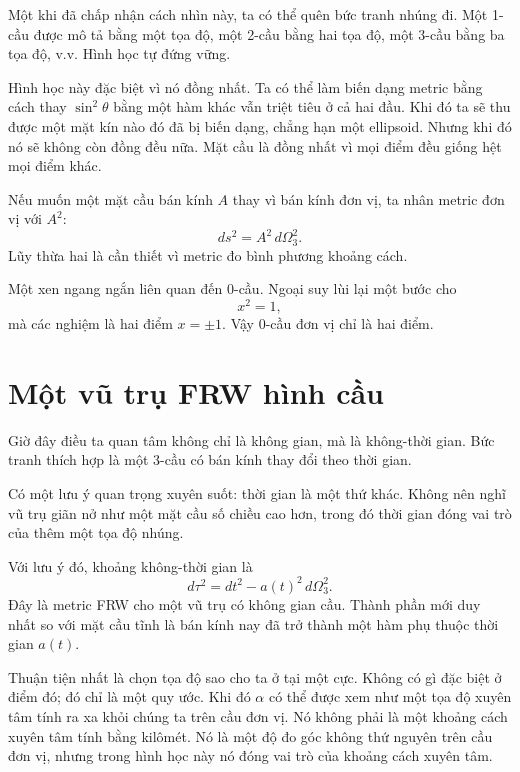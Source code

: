 Một khi đã chấp nhận cách nhìn này, ta có thể quên bức tranh nhúng đi. Một 1-cầu được mô tả bằng một tọa độ, một 2-cầu bằng hai tọa độ, một 3-cầu bằng ba tọa độ, v.v. Hình học tự đứng vững.

Hình học này đặc biệt vì nó đồng nhất. Ta có thể làm biến dạng metric bằng cách thay \(\sin^2\theta\) bằng một hàm khác vẫn triệt tiêu ở cả hai đầu. Khi đó ta sẽ thu được một mặt kín nào đó đã bị biến dạng, chẳng hạn một ellipsoid. Nhưng khi đó nó sẽ không còn đồng đều nữa. Mặt cầu là đồng nhất vì mọi điểm đều giống hệt mọi điểm khác.

Nếu muốn một mặt cầu bán kính \(A\) thay vì bán kính đơn vị, ta nhân metric đơn vị với \(A^2\):
\begin{equation}
ds^2=A^2\,d\Omega_3^2.
\end{equation}
Lũy thừa hai là cần thiết vì metric đo bình phương khoảng cách.

Một xen ngang ngắn liên quan đến 0-cầu. Ngoại suy lùi lại một bước cho
\begin{equation}
x^2=1,
\end{equation}
mà các nghiệm là hai điểm \(x=\pm 1\). Vậy 0-cầu đơn vị chỉ là hai điểm.

\section{Một vũ trụ FRW hình cầu}

Giờ đây điều ta quan tâm không chỉ là không gian, mà là không-thời gian. Bức tranh thích hợp là một 3-cầu có bán kính thay đổi theo thời gian.

Có một lưu ý quan trọng xuyên suốt: thời gian là một thứ khác. Không nên nghĩ vũ trụ giãn nở như một mặt cầu số chiều cao hơn, trong đó thời gian đóng vai trò của thêm một tọa độ nhúng.

Với lưu ý đó, khoảng không-thời gian là
\begin{equation}
d\tau^2=dt^2-a(t)^2\,d\Omega_3^2.
\end{equation}
Đây là metric FRW cho một vũ trụ có không gian cầu. Thành phần mới duy nhất so với mặt cầu tĩnh là bán kính nay đã trở thành một hàm phụ thuộc thời gian \(a(t)\).

Thuận tiện nhất là chọn tọa độ sao cho ta ở tại một cực. Không có gì đặc biệt ở điểm đó; đó chỉ là một quy ước. Khi đó \(\alpha\) có thể được xem như một tọa độ xuyên tâm tính ra xa khỏi chúng ta trên cầu đơn vị. Nó không phải là một khoảng cách xuyên tâm tính bằng kilômét. Nó là một độ đo góc không thứ nguyên trên cầu đơn vị, nhưng trong hình học này nó đóng vai trò của khoảng cách xuyên tâm.

